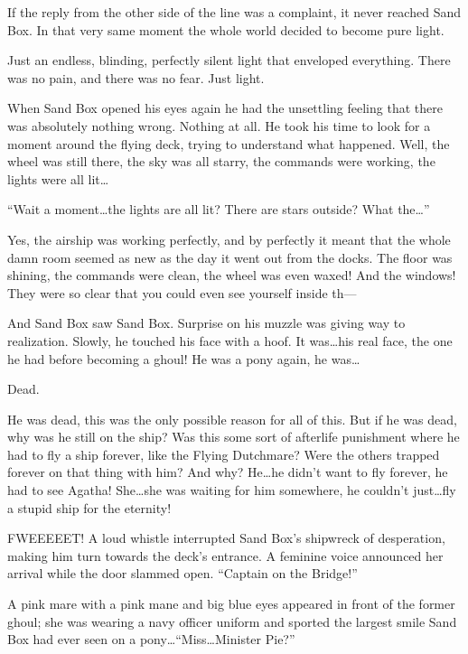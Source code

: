 If the reply from the other side of the line was a complaint, it never reached Sand Box. In that very same moment the whole world decided to become pure light.

Just an endless, blinding, perfectly silent light that enveloped everything. There was no pain, and there was no fear. Just light.

\horizonline

\englishunknowndaytimeplace

When Sand Box opened his eyes again he had the unsettling feeling that there was absolutely nothing wrong. Nothing at all. He took his time to look for a moment around the flying deck, trying to understand what happened. Well, the wheel was still there, the sky was all starry, the commands were working, the lights were all lit\dots

``Wait a moment\dots the lights are all lit? There are stars outside? What the\dots''

Yes, the airship was working perfectly, and by perfectly it meant that the whole damn room seemed as new as the day it went out from the docks. The floor was shining, the commands were clean, the wheel was even waxed! And the windows! They were so clear that you could even see yourself inside th---

And Sand Box saw Sand Box. Surprise on his muzzle was giving way to realization. Slowly, he touched his face with a hoof. It was\dots his real face, the one he had before becoming a ghoul! He was a pony again, he was\dots

Dead.

He was dead, this was the only possible reason for all of this. But if he was dead, why was he still on the ship? Was this some sort of afterlife punishment where he had to fly a ship forever, like the Flying Dutchmare? Were the others trapped forever on that thing with him? And why? He\dots he didn't want to fly forever, he had to see Agatha! She\dots she was waiting for him somewhere, he couldn't just\dots fly a stupid ship for the eternity!

FWEEEEET! A loud whistle interrupted Sand Box's shipwreck of desperation, making him turn towards the deck's entrance. A feminine voice announced her arrival while the door slammed open. ``Captain on the Bridge!''

A pink mare with a pink mane and big blue eyes appeared in front of the former ghoul; she was wearing a navy officer uniform and sported the largest smile Sand Box had ever seen on a pony\dots ``Miss\dots Minister Pie?''

